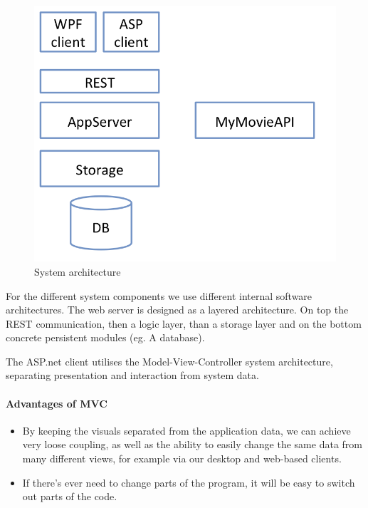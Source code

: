 \begin{figure}[H]
\begin{center}
\includegraphics[scale=0.7]{img/SDD/bdsaproject.png}
\caption{System architecture}
\label{fig:System architecture}
\end{center}
\end{figure}

For the different system components we use different internal software architectures. The web server is designed as a layered architecture. On top the REST communication, then a logic layer, than a storage layer and on the bottom concrete persistent modules (eg. A database).

The ASP.net client utilises the Model-View-Controller system architecture, separating presentation and interaction from system data.

\paragraph{Advantages of MVC}
\begin{itemize}
	\item By keeping the visuals separated from the application data, we can achieve very loose coupling, as well as the ability to easily change the same data from many different views, for example via our desktop and web-based clients. 
	\item If there's ever need to change parts of the program, it will be easy to switch out parts of the code.
\end{itemize}

